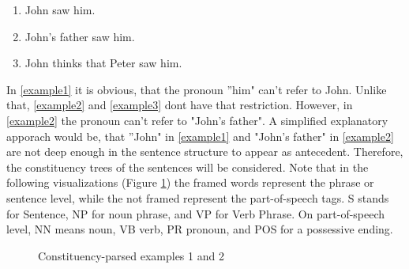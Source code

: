 \begin{center}
	\begin{enumerate}[label={(\arabic*)}]
	\item  \label{example1} John saw him.
	\item  \label{example2} John's father saw him.
	\item  \label{example3} John thinks that Peter saw him.
	\end{enumerate}
\end{center}

In \ref{example1} it is obvious, that the pronoun ''him" can't refer to John. Unlike that, \ref{example2} and \ref{example3} dont have that restriction. However, in \ref{example2} the pronoun can't refer to "John's father". A simplified explanatory apporach would be, that ''John" in \ref{example1} and "John's father" in \ref{example2} are not deep enough in the sentence structure to appear as antecedent. Therefore, the constituency trees of the sentences will be considered. Note that in the following visualizations (Figure \ref{fig:twoTreeExample}) the framed words represent the phrase or sentence level, while the not framed represent the part-of-speech tags. S stands for Sentence, NP for noun phrase, and VP for Verb Phrase. On part-of-speech level, NN means noun, VB verb, PR pronoun, and POS for a possessive ending. %

\begin{figure}[h]
    \centering\sffamily
{}
    \caption{Constituency-parsed examples 1 and 2}%
    \label{fig:twoTreeExample}%
\end{figure}

